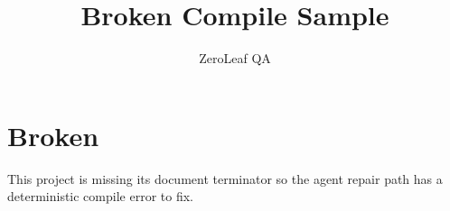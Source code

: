 \documentclass{article}
\title{Broken Compile Sample}
\author{ZeroLeaf QA}
\begin{document}
\maketitle

\section{Broken}
This project is missing its document terminator so the agent repair path has a
deterministic compile error to fix.
\end{document}
